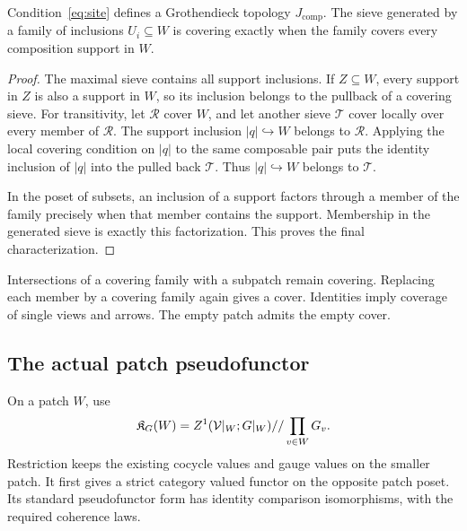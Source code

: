 \begin{proposition}\label{KS35}
Condition~\eqref{eq:site} defines a Grothendieck topology \(J_{\mathrm{comp}}\). The sieve generated by a family of inclusions \(U_i\subseteq W\) is covering exactly when the family covers every composition support in \(W\).
\end{proposition}
\begin{proof}
The maximal sieve contains all support inclusions. If \(Z\subseteq W\), every support in \(Z\) is also a support in \(W\), so its inclusion belongs to the pullback of a covering sieve. For transitivity, let \(\mathcal R\) cover \(W\), and let another sieve \(\mathcal T\) cover locally over every member of \(\mathcal R\). The support inclusion \(|q|\hookrightarrow W\) belongs to \(\mathcal R\). Applying the local covering condition on \(|q|\) to the same composable pair puts the identity inclusion of \(|q|\) into the pulled back \(\mathcal T\). Thus \(|q|\hookrightarrow W\) belongs to \(\mathcal T\).

In the poset of subsets, an inclusion of a support factors through a member of the family precisely when that member contains the support. Membership in the generated sieve is exactly this factorization. This proves the final characterization.
\end{proof}
Intersections of a covering family with a subpatch remain covering. Replacing each member by a covering family again gives a cover. Identities imply coverage of single views and arrows. The empty patch admits the empty cover.

\subsection{The actual patch pseudofunctor}
On a patch \(W\), use
\[
 \mathfrak K_G(W)=Z^1(\mathcal V|_W;G|_W)//\prod_{v\in W}G_v.
\]
Restriction keeps the existing cocycle values and gauge values on the smaller patch. It first gives a strict category valued functor on the opposite patch poset. Its standard pseudofunctor form has identity comparison isomorphisms, with the required coherence laws.

